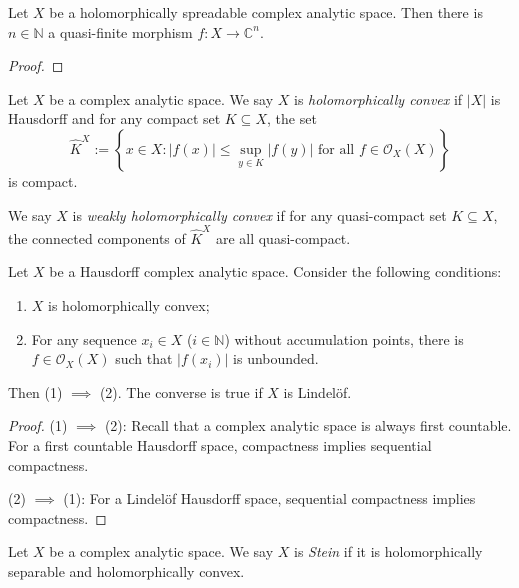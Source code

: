 \begin{thm}[Grauert]
    Let $X$ be a holomorphically spreadable complex analytic space. Then there is $n\in \mathbb{N}$ a quasi-finite morphism $f:X\rightarrow \mathbb{C}^n$.
\end{thm}
\begin{proof}
    
\end{proof}

\begin{definition}
    Let $X$ be a complex analytic space. We say $X$ is \emph{holomorphically convex} if $|X|$ is Hausdorff and for any compact set $K\subseteq X$, the set 
    \[
        \hat{K}^X:=\left\{ x\in X: |f(x)|\leq \sup_{y\in K}|f(y)|\text{ for all }f\in \mathcal{O}_X(X) \right\}  
    \]
    is compact.

    We say $X$ is \emph{weakly holomorphically convex} if for any quasi-compact set $K\subseteq X$, the connected components of $\hat{K}^X$ are all quasi-compact.
\end{definition}
\begin{proposition}
    Let $X$ be a Hausdorff complex analytic space. Consider the following conditions:
    \begin{enumerate}
        \item $X$ is holomorphically convex;
        \item For any sequence $x_i\in X$ ($i\in \mathbb{N}$) without accumulation points, there is $f\in \mathcal{O}_X(X)$ such that $|f(x_i)|$ is unbounded.
    \end{enumerate}
    Then (1) $\implies$ (2). The converse is true if $X$ is Lindelöf.
\end{proposition}
\begin{proof}
    (1) $\implies$ (2):
    Recall that a complex analytic space is always first countable. For a first countable Hausdorff space, compactness implies sequential compactness.

    (2) $\implies$ (1): For a Lindelöf Hausdorff space, sequential compactness implies compactness. 
\end{proof}

\begin{definition}
    Let $X$ be a complex analytic space. We say $X$ is \emph{Stein} if it is holomorphically separable and holomorphically convex.
\end{definition}


\cite{stacks-project}

\printbibliography
